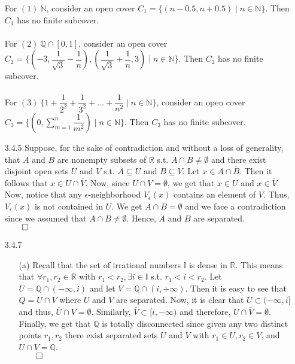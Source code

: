 \documentclass[11pt]{article}
\newcommand{\nats}{\mathbb{N}}
\newcommand{\reals}{\mathbb{R}}
\newcommand{\rats}{\mathbb{Q}}
\newcommand{\irrats}{\mathbb{I}}
\begin{document}
\begin{itemize}
        For $(1)\ \nats$, consider an open cover $C_1 = \{(n - 0.5, n + 0.5)
        \mid n \in \nats\}$. Then $C_1$ has no finite subcover.
        \\
        \\
        For $(2)\ \rats \cap [0, 1]$, consider an open cover $C_2 = \{(-3,
        \dfrac{1}{\sqrt{3}} - \dfrac{1}{n}), (\dfrac{1}{\sqrt{3}} +
        \dfrac{1}{n}, 3) \mid n \in \nats\}$. Then $C_2$ has no finite
        subcover.
        \\
        \\
        For $(3)\ \{1 + \dfrac{1}{2^2} + \dfrac{1}{3^2} + \dots +
        \dfrac{1}{n^2} \mid n \in \nats\}$, consider an open cover $C_3 = \{
        (0, \sum_{m = 1}^n \dfrac{1}{m^2}) \mid n \in \nats\}$. Then $C_3$ has
        no finite subcover.

    \item[3.4.5]
        Suppose, for the sake of contradiction and without a loss of
        generality, that $A$ and $B$ are nonempty subsets of $\reals$ s.t. $A
        \cap B \neq \emptyset$ and there exist disjoint open sets $U$ and $V$
        s.t. $A \subseteq U$ and $B \subseteq V$. Let $x \in A \cap
        \overline{B}$. Then it follows that $x \in U \cap \overline{V}$.  Now,
        since $U \cap V = \emptyset$, we get that $x \in U$ and $x \in
        \overline{V}$. Now, notice that any $\epsilon$-neighborhood
        $V_\epsilon(x)$ contains an element of $V$. Thus, $V_\epsilon(x)$ is
        not contained in $U$. We get $A \cap B = \emptyset$ and we face a
        contradiction since we assumed that $A \cap B \neq \emptyset$. Hence,
        $A$ and $B$ are separated.\\
        $\qed$

    \item[3.4.7]
        \begin{itemize}
            \item[(a)]
                Recall that the set of irrational numbers $\irrats$ is dense in
                $\reals$. This means that $\forall r_1, r_2 \in \reals$ with
                $r_1 < r_2, \exists i \in \irrats$ s.t. $r_1 < i < r_2$. Let $U
                = \rats \cap (-\infty, i)$ and let $V = \rats \cap (i,
                +\infty)$. Then it is easy to see that $Q = U \cap V$ where $U$
                and $V$ are separated. Now, it is clear that $\overline{U}
                \subset (-\infty, i]$ and thus, $\overline{U} \cap V =
                \emptyset$.  Similarly, $\overline{V} \subset [i, -\infty)$ and
                therefore, $U \cap \overline{V} = \emptyset$. Finally, we get
                that $\rats$ is totally disconnected since given any two
                distinct points $r_1, r_2$ there exist separated sets $U$ and
                $V$ with $r_1 \in U, r_2 \in V$, and $U \cap V = \rats$.\\
                $\qed$


\end{itemize}
\end{itemize}
\end{document}
